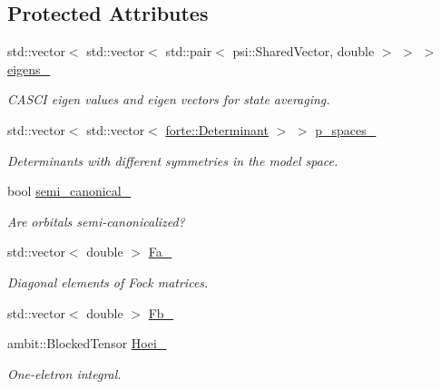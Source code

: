 \subsection*{Protected Attributes}
\begin{DoxyCompactItemize}
\item 
std\+::vector$<$ std\+::vector$<$ std\+::pair$<$ psi\+::\+Shared\+Vector, double $>$ $>$ $>$ \mbox{\hyperlink{classforte_1_1_d_s_r_g___m_r_p_t2_ac22e8c419a09d2fd29cdb675aff1caf1}{eigens\+\_\+}}
\begin{DoxyCompactList}\small\item\em C\+A\+S\+CI eigen values and eigen vectors for state averaging. \end{DoxyCompactList}\item 
std\+::vector$<$ std\+::vector$<$ \mbox{\hyperlink{namespaceforte_a2076c63fd7b8732004d9e1442ce527c1}{forte\+::\+Determinant}} $>$ $>$ \mbox{\hyperlink{classforte_1_1_d_s_r_g___m_r_p_t2_a842b10af7e2b96e27d0aaa9fd2da21b8}{p\+\_\+spaces\+\_\+}}
\begin{DoxyCompactList}\small\item\em Determinants with different symmetries in the model space. \end{DoxyCompactList}\item 
bool \mbox{\hyperlink{classforte_1_1_d_s_r_g___m_r_p_t2_ab4b37a2b2a1bf01caad8165f7476dc49}{semi\+\_\+canonical\+\_\+}}
\begin{DoxyCompactList}\small\item\em Are orbitals semi-\/canonicalized? \end{DoxyCompactList}\item 
std\+::vector$<$ double $>$ \mbox{\hyperlink{classforte_1_1_d_s_r_g___m_r_p_t2_a57e10017a1e9c437f6cc595c6676b93d}{Fa\+\_\+}}
\begin{DoxyCompactList}\small\item\em Diagonal elements of Fock matrices. \end{DoxyCompactList}\item 
std\+::vector$<$ double $>$ \mbox{\hyperlink{classforte_1_1_d_s_r_g___m_r_p_t2_a69f14f8c555585902fa90bb4767d5b0b}{Fb\+\_\+}}
\item 
ambit\+::\+Blocked\+Tensor \mbox{\hyperlink{classforte_1_1_d_s_r_g___m_r_p_t2_acf90518da17c2d21981798280a7333ea}{Hoei\+\_\+}}
\begin{DoxyCompactList}\small\item\em One-\/eletron integral. \end{DoxyCompactList}\item 

\end{DoxyCompactItemize}
